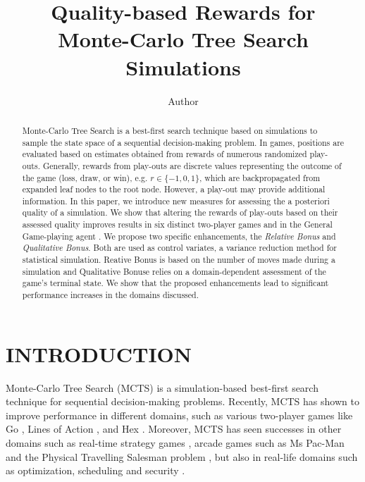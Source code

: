 \documentclass{ecai2014}
\begin{document}
\title{Quality-based Rewards for \\ Monte-Carlo Tree Search Simulations}
\author{Author}

\maketitle


\begin{abstract}
Monte-Carlo Tree Search is a best-first search technique based on simulations to sample the state space of a sequential decision-making problem. In games, positions are evaluated based on estimates obtained from rewards of numerous randomized play-outs. Generally, rewards from play-outs are discrete values representing the outcome of the game (loss, draw, or win), e.g. $r \in \{-1, 0, 1\}$, which are backpropagated from expanded leaf nodes to the root node. However, a play-out may provide additional information. In this paper, we introduce new measures for assessing the a posteriori quality of a simulation. We show that altering the rewards of play-outs based on their assessed quality improves results in six distinct two-player games and in the General Game-playing agent {}. We propose two specific enhancements, the \emph{Relative Bonus} and \emph{Qualitative Bonus}. Both are used as control variates, a variance reduction method for statistical simulation. Reative Bonus is based on the number of moves made during a simulation and Qualitative Bonuse relies on a domain-dependent assessment of the game's terminal state. We show that the proposed enhancements lead to significant performance increases in the domains discussed.
\end{abstract}

\section{INTRODUCTION}
\label{sec:intro}
Monte-Carlo Tree Search (MCTS) \cite{coulom2007efficient,kocsis2006bandit} is a simulation-based best-first search technique for sequential decision-making problems. Recently, MCTS has shown to improve performance in different domains, such as various two-player games like Go \cite{lee2010current}, Lines of Action \cite{Winands2010b}, and Hex \cite{arneson2010monte}. Moreover, MCTS has seen successes in other domains such as real-time strategy games \cite{browne2012survey}, arcade games such as Ms Pac-Man \cite{enhancementspacmancig12} and the Physical Travelling Salesman problem \cite{powleytsp}, but also in real-life domains such as optimization, scheduling and security \cite{browne2012survey}.
\end{document}
